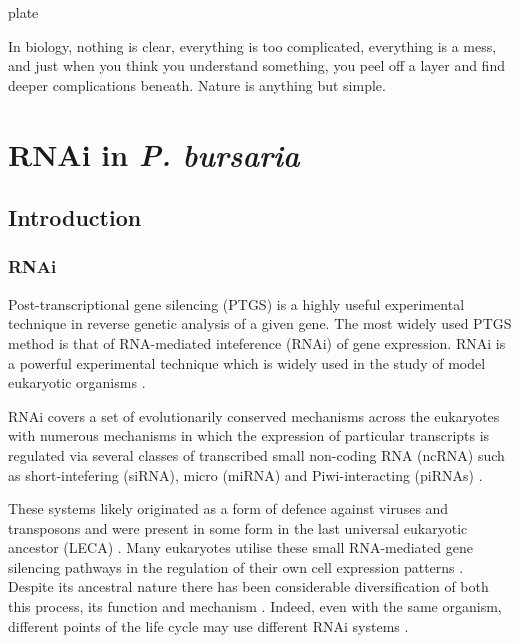 plate \graphicspath{{chapters/6.Chapter_4/figures/}}

\begin{savequote}[75mm]
In biology, nothing is clear, everything is too complicated, everything is a mess, 
and just when you think you understand something, you peel off a layer and find 
deeper complications beneath. Nature is anything but simple.
\end{savequote}

\chapter{RNAi in \textit{P. bursaria}}

\section{Introduction}

\subsection{RNAi}

Post-transcriptional gene silencing (PTGS) is a highly useful experimental technique
in reverse genetic analysis of a given gene.  
The most widely used PTGS method is that of RNA-mediated inteference (RNAi)
of gene expression. 
RNAi \citep{Fire1998} is a powerful experimental technique which is widely used 
in the study of model eukaryotic organisms \citep{Morf2013,Batista2011,Matthew2004,Ketting2011,Chang2012}.

RNAi covers a set of evolutionarily conserved mechanisms across the eukaryotes 
with numerous mechanisms in which the expression of particular transcripts
is regulated via several classes of transcribed small non-coding RNA (ncRNA)
such as short-intefering (siRNA), micro (miRNA) and Piwi-interacting (piRNAs) \citep{Carthew2009}.

These systems likely originated as a form of defence against
viruses and transposons \citep{Waterhouse2001,Buchon2006}
and were present in some form in the last universal eukaryotic
ancestor (LECA) \citep{Cerutti2006,Shabalina2008}.  Many eukaryotes
utilise these small RNA-mediated gene silencing pathways
in the regulation of their own cell expression patterns \citep{Wu2008}.
Despite its ancestral nature there has been considerable diversification
of both this process, its function and mechanism \citep{Ketting2011}.
Indeed, even with the same organism, different points of the life cycle
may use different RNAi systems \citep{Flemr2013}.


